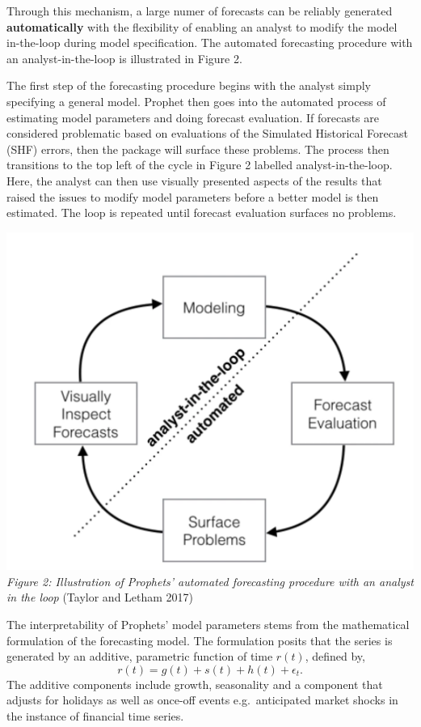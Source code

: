 \documentclass[12pt,a4paper]{article}
\numberwithin{equation}{section}
\numberwithin{figure}{section}
\numberwithin{table}{section}
\begin{document}
Through this mechanism, a large numer of forecasts can be reliably
generated \textbf{automatically} with the flexibility of enabling an
analyst to modify the model in-the-loop during model specification. The
automated forecasting procedure with an analyst-in-the-loop is
illustrated in Figure 2.

The first step of the forecasting procedure begins with the analyst
simply specifying a general model. Prophet then goes into the automated
process of estimating model parameters and doing forecast evaluation. If
forecasts are considered problematic based on evaluations of the
Simulated Historical Forecast (SHF) errors, then the package will
surface these problems. The process then transitions to the top left of
the cycle in Figure 2 labelled analyst-in-the-loop. Here, the analyst
can then use visually presented aspects of the results that raised the
issues to modify model parameters before a better model is then
estimated. The loop is repeated until forecast evaluation surfaces no
problems.

\includegraphics[width=1.00000\textwidth]{analyst in the loop.png}\\
\emph{Figure 2: Illustration of Prophets' automated forecasting
procedure with an analyst in the loop} (Taylor and Letham 2017)

The interpretability of Prophets' model parameters stems from the
mathematical formulation of the forecasting model. The formulation
posits that the series is generated by an additive, parametric function
of time \(r(t)\), defined by,
\[ r(t) = g(t) + s(t) +  h(t) + \epsilon_t.\] The additive components
include growth, seasonality and a component that adjusts for holidays as
well as once-off events e.g.~anticipated market shocks in the instance
of financial time series.
\end{document}
